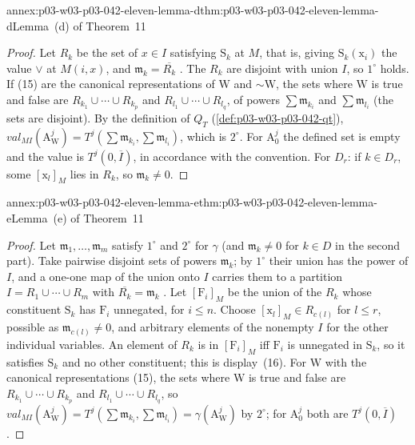 \begin{annexitem}{annex:p03-w03-p03-042-eleven-lemma-d}{thm:p03-w03-p03-042-eleven-lemma-d}{Lemma~(d) of Theorem~11}
\begin{proof}
Let \(R_k\) be the set of \(x\in I\) satisfying \(\mathrm S_k\) at \(M\),
that is, giving \(\mathrm S_k(\mathrm x_i)\) the value \(\vee\) at
\(M(i,x)\), and \(\mathfrak m_k=\overline{R_k}\)
\cite[p.~34]{Mostowski1957}.  The \(R_k\) are disjoint with union \(I\),
so \(1^\circ\) holds.  If (15) are the canonical representations of
\(\mathrm W\) and \({\sim}\mathrm W\), the sets where \(\mathrm W\) is
true and false are \(R_{k_1}\cup\cdots\cup R_{k_p}\) and \(R_{l_1}\cup
\cdots\cup R_{l_q}\), of powers \(\sum\mathfrak m_{k_i}\) and
\(\sum\mathfrak m_{l_i}\) (the sets are disjoint).  By the definition of
\(Q_T\) (\cref{def:p03-w03-p03-042-qt}),
\(\mathit{val}_{MI}(\mathrm A^j_{\mathrm W})=T^j(\sum\mathfrak m_{k_i},
\sum\mathfrak m_{l_i})\), which is \(2^\circ\).  For \(\mathrm A^j_0\)
the defined set is empty and the value is \(T^j(0,\overline I)\), in
accordance with the convention.  For \(D_r\): if \(k\in D_r\), some
\([\mathrm x_l]_M\) lies in \(R_k\), so \(\mathfrak m_k\neq0\).
\end{proof}
\end{annexitem}

\begin{annexitem}{annex:p03-w03-p03-042-eleven-lemma-e}{thm:p03-w03-p03-042-eleven-lemma-e}{Lemma~(e) of Theorem~11}
\begin{proof}
Let \(\mathfrak m_1,\ldots,\mathfrak m_m\) satisfy \(1^\circ\) and
\(2^\circ\) for \(\gamma\) (and \(\mathfrak m_k\neq0\) for \(k\in D\) in
the second part).  Take pairwise disjoint sets of powers \(\mathfrak
m_k\); by \(1^\circ\) their union has the power of \(I\), and a one-one
map of the union onto \(I\) carries them to a partition \(I=R_1\cup
\cdots\cup R_m\) with \(\overline{R_k}=\mathfrak m_k\)
\cite[p.~34]{Mostowski1957}.  Let \([\mathrm F_i]_M\) be the union of the
\(R_k\) whose constituent \(\mathrm S_k\) has \(\mathrm F_i\) unnegated,
for \(i\leq n\).  Choose \([\mathrm x_l]_M\in R_{c(l)}\) for \(l\leq r\),
possible as \(\mathfrak m_{c(l)}\neq0\), and arbitrary elements of the
nonempty \(I\) for the other individual variables.  An element of
\(R_k\) is in \([\mathrm F_i]_M\) iff \(\mathrm F_i\) is unnegated in
\(\mathrm S_k\), so it satisfies \(\mathrm S_k\) and no other
constituent; this is display~(16).  For \(\mathrm W\) with the canonical
representations (15), the sets where \(\mathrm W\) is true and false are
\(R_{k_1}\cup\cdots\cup R_{k_p}\) and \(R_{l_1}\cup\cdots\cup R_{l_q}\),
so \(\mathit{val}_{MI}(\mathrm A^j_{\mathrm W})=T^j(\sum\mathfrak
m_{k_i},\sum\mathfrak m_{l_i})=\gamma(\mathrm A^j_{\mathrm W})\) by
\(2^\circ\); for \(\mathrm A^j_0\) both are \(T^j(0,\overline I)\).
\end{proof}
\end{annexitem}

